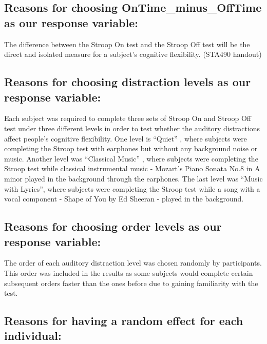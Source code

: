 \documentclass[]{article}
\begin{document}
\hypertarget{reasons-for-choosing-ontime_minus_offtime-as-our-response-variable}{%
\subsection{Reasons for choosing OnTime\_minus\_OffTime as our response
variable:}\label{reasons-for-choosing-ontime_minus_offtime-as-our-response-variable}}

The difference between the Stroop On test and the Stroop Off test will
be the direct and isolated measure for a subject's cognitive
flexibility. (STA490 handout)

\hypertarget{reasons-for-choosing-distraction-levels-as-our-response-variable}{%
\subsection{Reasons for choosing distraction levels as our response
variable:}\label{reasons-for-choosing-distraction-levels-as-our-response-variable}}

Each subject was required to complete three sets of Stroop On and Stroop
Off test under three different levels in order to test whether the
auditory distractions affect people's cognitive flexibility. One level
is ``Quiet'' , where subjects were completing the Stroop test with
earphones but without any background noise or music. Another level was
``Classical Music'' , where subjects were completing the Stroop test
while classical instrumental music - Mozart's Piano Sonata No.8 in A
minor played in the background through the earphones. The last level was
``Music with Lyrics'', where subjects were completing the Stroop test
while a song with a vocal component - Shape of You by Ed Sheeran -
played in the background.

\hypertarget{reasons-for-choosing-order-levels-as-our-response-variable}{%
\subsection{Reasons for choosing order levels as our response
variable:}\label{reasons-for-choosing-order-levels-as-our-response-variable}}

The order of each auditory distraction level was chosen randomly by
participants. This order was included in the results as some subjects
would complete certain subsequent orders faster than the ones before due
to gaining familiarity with the test.

\hypertarget{reasons-for-having-a-random-effect-for-each-individual}{%
\subsection{Reasons for having a random effect for each
individual:}\label{reasons-for-having-a-random-effect-for-each-individual}}
\end{document}

